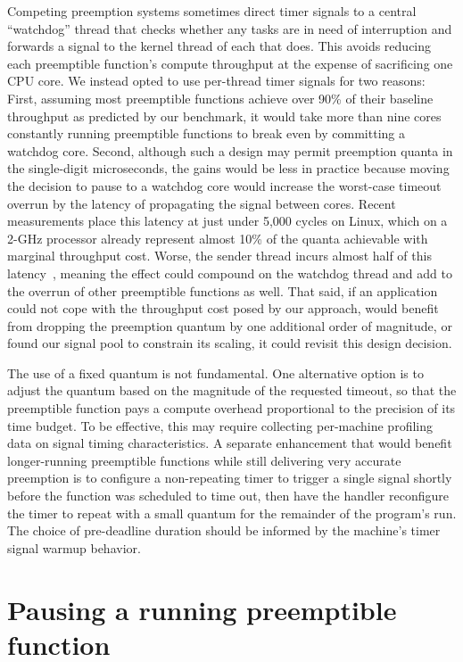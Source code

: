 Competing preemption systems sometimes direct timer signals to a central ``watchdog''
thread that checks whether any tasks are in need of interruption and forwards a
signal to the kernel thread of each that does.  This avoids reducing each preemptible
function's compute throughput at the expense of sacrificing one CPU core.  We instead
opted to use per-thread timer signals for two reasons:  First, assuming most
preemptible functions achieve over 90\% of their baseline throughput as predicted by
our benchmark, it would take more than nine cores constantly running preemptible
functions to break even by committing a watchdog core.  Second, although such a
design may permit preemption quanta in the single-digit microseconds, the gains would
be less in practice because moving the decision to pause to a watchdog core would
increase the worst-case timeout overrun by the latency of propagating the signal
between cores.  Recent measurements place this latency at just under 5,000 cycles on
Linux, which on a 2-GHz processor already represent almost 10\% of the quanta
achievable with marginal throughput cost.  Worse, the sender thread incurs almost
half of this latency~\cite{Kaffes:nsdi2019}, meaning the effect could compound on the
watchdog thread and add to the overrun of other preemptible functions as well.
That said, if an application could not cope with the throughput cost posed by our
approach, would benefit from dropping the preemption quantum by one additional order
of magnitude, or found our signal pool to constrain its scaling, it could revisit
this design decision.

The use of a fixed quantum is not fundamental.  One alternative option is to adjust
the quantum based on the magnitude of the requested timeout, so that the preemptible
function pays a compute overhead proportional to the precision of its time budget.
To be effective, this may require collecting per-machine profiling data on signal
timing characteristics.  A separate enhancement that would benefit longer-running
preemptible functions while still delivering very accurate preemption is to
configure a non-repeating timer to trigger a single signal shortly before the
function was scheduled to time out, then have the handler reconfigure the timer to
repeat with a small quantum for the remainder of the program's run.  The choice of
pre-deadline duration should be informed by the machine's timer signal warmup
behavior.


\section{Pausing a running preemptible function}
\label{sec:libinger:pausing}

